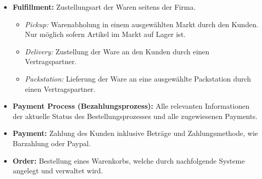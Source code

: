 \begin{itemize}[noitemsep,nolistsep]
	\item \textbf{Fulfillment: } {Zustellungsart der Waren seitens der Firma.}
	\begin{itemize}[noitemsep,nolistsep]
		\item \textit{Pickup: } {Warenabholung in einem ausgewählten Markt durch den Kunden. Nur möglich sofern Artikel im Markt auf Lager ist.}
		\item \textit{Delivery: } {Zustellung der Ware an den Kunden durch einen Vertragspartner.}
		\item \textit{Packstation: } {Lieferung der Ware an eine ausgewählte Packstation durch einen Vertragspartner.}
	\end{itemize}
	\item \textbf{Payment Process (Bezahlungsprozess): } {Alle relevanten Informationen der aktuelle Status des Bestellungsprozesses und alle zugewiesenen Payments.}
	\item \textbf{Payment: } {Zahlung des Kunden inklusive Beträge und Zahlungsmethode, wie Barzahlung oder Paypal.}
	\item \textbf{Order: } {Bestellung eines Warenkorbs, welche durch nachfolgende Systeme angelegt und verwaltet wird.}
\end{itemize}
\vspace{0.4em}

